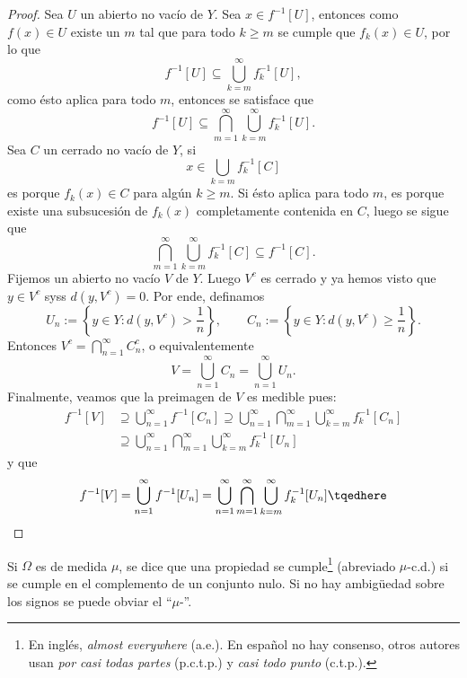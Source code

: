 \begin{proof}
	Sea $U$ un abierto no vacío de $Y$.
	Sea $x \in f^{-1}[U]$, entonces como $f(x) \in U$ existe un $m$ tal que para todo $k\ge m$ se cumple que $f_k(x) \in U$, por lo que
	$$ f^{-1}[U] \subseteq \bigcup_{k=m}^\infty f^{-1}_k[U], $$
	como ésto aplica para todo $m$, entonces se satisface que
	$$ f^{-1}[U] \subseteq \bigcap_{m=1}^\infty \bigcup_{k=m}^\infty f^{-1}_k[U]. $$
	Sea $C$ un cerrado no vacío de $Y$, si
	$$ x \in \bigcup_{k=m} f_k^{-1}[C] $$
	es porque $f_k(x) \in C$ para algún $k \ge m$.
	Si ésto aplica para todo $m$, es porque existe una subsucesión de $f_k(x)$ completamente contenida en $C$,
	luego se sigue que
	$$ \bigcap_{m=1}^\infty \bigcup_{k=m}^\infty f^{-1}_k[C] \subseteq f^{-1}[C]. $$
	Fijemos un abierto no vacío $V$ de $Y$.
	Luego $V^c$ es cerrado y ya hemos visto que $y \in V^c$ syss $d(y, V^c) = 0$.
	Por ende, definamos
	$$ U_n := \left\{ y\in Y : d(y, V^c) > \frac{1}{n} \right\}, \qquad C_n := \left\{ y\in Y : d(y, V^c) \ge \frac{1}{n} \right\}. $$
	Entonces $V^c = \bigcap_{n=1}^\infty C_n^c$, o equivalentemente
	$$ V = \bigcup_{n=1}^\infty C_n = \bigcup_{n=1}^\infty U_n. $$
	Finalmente, veamos que la preimagen de $V$ es medible pues:
	\begin{align*}
		f^{-1}[V] &\supseteq \bigcup_{n=1}^\infty f^{-1}[C_n] \supseteq \bigcup_{n=1}^\infty \bigcap_{m=1}^\infty \bigcup_{k=m}^\infty f^{-1}_k[C_n] \\
		&\supseteq \bigcup_{n=1}^\infty \bigcap_{m=1}^\infty \bigcup_{k=m}^\infty f^{-1}_k[U_n]
	\end{align*}
	y que 
	\begin{equation}
		f^{-1}[V] = \bigcup_{n=1}^{\infty} f^{-1}[U_n] = \bigcup_{n=1}^{\infty} \bigcap_{m=1}^\infty \bigcup_{k=m}^\infty f^{-1}_k[U_n] \tqedhere
	\end{equation}
\end{proof}

\begin{mydefi}
	Si $\Omega$ es de medida $\mu$, se dice que una propiedad se cumple\footnote{En inglés, \textit{almost everywhere} (a.e.).
	En español no hay consenso, otros autores usan \textit{por casi todas partes} (p.c.t.p.) y \textit{casi todo punto} (c.t.p.).}
	 (abreviado $\mu$-c.d.) si se cumple en el complemento de un conjunto nulo.
	Si no hay ambigüedad sobre los signos se puede obviar el ``$\mu$-''.
\end{mydefi}

